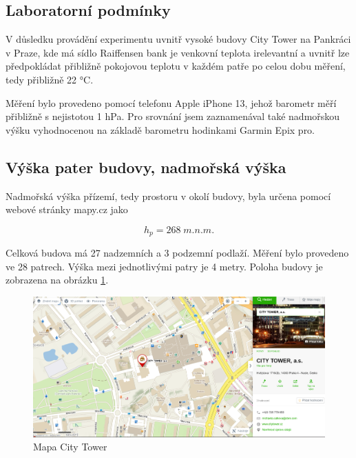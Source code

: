 \subsection{Laboratorní podmínky}

V důsledku provádění experimentu uvnitř vysoké budovy City Tower na Pankráci v Praze, kde má sídlo Raiffensen bank je venkovní teplota irelevantní a uvnitř lze předpokládat přibližně pokojovou teplotu v každém patře po celou dobu měření, tedy přibližně 22 °C.

Měření bylo provedeno pomocí telefonu Apple iPhone 13, jehož barometr měří přibližně s nejistotou 1 hPa. Pro srovnání jsem zaznamenával také nadmořskou výšku vyhodnocenou na základě barometru hodinkami Garmin Epix pro.

\subsection{Výška pater budovy, nadmořská výška}
Nadmořská výška přízemí, tedy prostoru v okolí budovy, byla určena pomocí webové stránky mapy.cz jako

\begin{equation}
    \nonumber
    h_p = 268 \; m. n. m.
\end{equation}

Celková budova má 27 nadzemních a 3 podzemní podlaží. Měření bylo provedeno ve 28 patrech. Výška mezi jednotlivými patry je 4 metry. Poloha budovy je zobrazena na obrázku \ref{fig:city-tower-mapa}.

\begin{figure}[h]
    \centering
    \includegraphics[width=1\linewidth]{Y1 - Závislost atmosférického tlaku na výšce – výletní//Protokol - závislost atmosférického tlaku na výšce – výletní//img/City Tower_mapy.png}
    \caption{Mapa City Tower}
    \label{fig:city-tower-mapa}
\end{figure}


